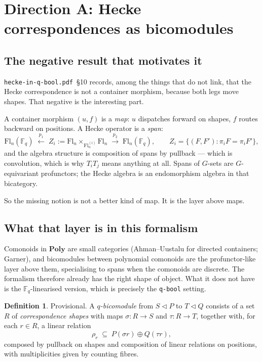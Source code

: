 \documentclass[11pt,a4paper]{article}
\theoremstyle{definition}
\newtheorem{definition}[theorem]{Definition}
\theoremstyle{remark}
\newcommand{\HQB}{\texttt{hecke-\allowbreak{}in-\allowbreak{}q-\allowbreak{}bool.pdf}}
\newcommand{\FF}{\mathbb{F}}
\newcommand{\cat}[1]{\mathbf{#1}}
\newcommand{\Poly}{\cat{Poly}}
\newcommand{\con}{\triangleleft}
\newcommand{\Fl}{\mathrm{Fl}}
\begin{document}
\section{Direction A: Hecke correspondences as bicomodules}\label{sec:A}

\subsection{The negative result that motivates it}

\HQB{}~\S10 records, among the things that do not link,
that the Hecke correspondence is not a container morphism, because both legs
move shapes. That negative is the interesting part.

A container morphism $(u,f)$ is a \emph{map}: $u$ dispatches forward on shapes,
$f$ routes backward on positions. A Hecke operator is a \emph{span}:
\[
  \Fl_n(\FF_q) \;\xleftarrow{\ p_1\ }\;
  Z_i := \Fl_n \times_{\Fl_n^{(i)}} \Fl_n
  \;\xrightarrow{\ p_2\ }\; \Fl_n(\FF_q),
  \qquad
  Z_i = \{(F,F') : \pi_i F = \pi_i F'\},
\]
and the algebra structure is composition of spans by pullback --- which is
convolution, which is why $T_iT_j$ means anything at all. Spans of $G$-sets are
$G$-equivariant profunctors; the Hecke algebra is an endomorphism algebra in
that bicategory.

So the missing notion is not a better kind of map. It is the layer above maps.

\subsection{What that layer is in this formalism}

Comonoids in $\Poly$ are small categories (Ahman--Uustalu for directed
containers; Garner), and bicomodules between polynomial comonoids are the
profunctor-like layer above them, specialising to spans when the comonoids are
discrete. The formalism therefore already has the right shape of object. What it
does not have is the $\FF_q$-linearised version, which is precisely the
\texttt{q-bool} setting.

\begin{definition}\label{def:qspan}
Provisional. A \emph{$q$-bicomodule} from $S \con P$ to $T \con Q$ consists of a
set $R$ of \emph{correspondence shapes} with maps $\sigma : R \to S$ and
$\tau : R \to T$, together with, for each $r \in R$, a linear relation
\[
  \rho_r \;\subseteq\; P(\sigma r) \oplus Q(\tau r) ,
\]
composed by pullback on shapes and composition of linear relations on positions,
with multiplicities given by counting fibres.
\end{definition}
\end{document}
